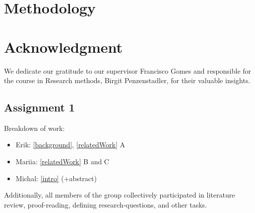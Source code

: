 \documentclass[conference]{IEEEtran}
\begin{document}
\section{Methodology}

\section*{Acknowledgment}

We dedicate our gratitude to our supervisor Francisco Gomes and responsible for the course in Research methods, Birgit Penzenstadler, for their valuable insights.

\subsection*{Assignment 1}

Breakdown of work:
\begin{itemize}
    \item Erik: \ref{background}, \ref{relatedWork} A
    \item Mariia: \ref{relatedWork} B and C
    \item Michal: \ref{intro} (+abstract)
\end{itemize}

Additionally, all members of the group collectively participated in literature
review, proof-reading, defining research-questions, and other tasks.



\end{document}
